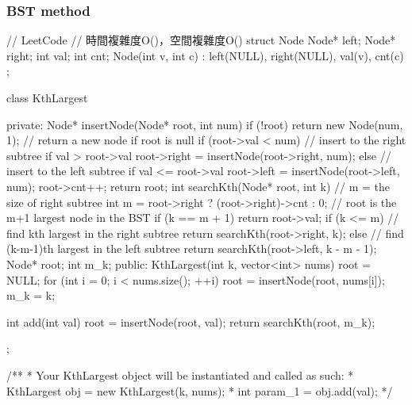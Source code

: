 \subsubsection{BST method}
\begin{Code}
// LeetCode
// 時間複雜度O()，空間複雜度O()
struct Node {
    Node* left;
    Node* right;
    int val;
    int cnt;
    Node(int v, int c) : left(NULL), right(NULL), val(v), cnt(c) {}
};

class KthLargest {
private:
    Node* insertNode(Node* root, int num) {
        if (!root) {
            return new Node(num, 1);      // return a new node if root is null
        }
        if (root->val < num) {  // insert to the right subtree if val > root->val
            root->right = insertNode(root->right, num);
        } else {  // insert to the left subtree if val <= root->val
            root->left = insertNode(root->left, num);
        }
        root->cnt++;
        return root;
    }
    int searchKth(Node* root, int k) {
        // m = the size of right subtree
        int m = root->right ? (root->right)->cnt : 0;
        // root is the m+1 largest node in the BST
        if (k == m + 1) {
            return root->val;
        }
        if (k <= m) {
            // find kth largest in the right subtree
            return searchKth(root->right, k);
        } else {
            // find (k-m-1)th largest in the left subtree
            return searchKth(root->left, k - m - 1);
        }
    }
    Node* root;
    int m_k;
public:
    KthLargest(int k, vector<int> nums) {
        root = NULL;
        for (int i = 0; i < nums.size(); ++i) {
            root = insertNode(root, nums[i]);
        }
        m_k = k;
    }

    int add(int val) {
        root = insertNode(root, val);
        return searchKth(root, m_k);
    }
};

/**
 * Your KthLargest object will be instantiated and called as such:
 * KthLargest obj = new KthLargest(k, nums);
 * int param_1 = obj.add(val);
 */
\end{Code}

